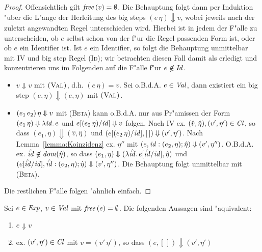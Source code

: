 \documentclass[12pt,fleqn,a4paper]{article}
\newcommand{\RN}[1]{\mbox{\textsc{(#1)}}}
\newcommand{\Cl}{\name{Cl}}
\begin{document}
\begin{proof}
  Offensichtlich gilt ${\text{\it free\/}}\,(v) = \emptyset$. Die Behauptung folgt
  dann per Induktion "uber die L"ange der Herleitung des big steps $(e\,\eta) \Downarrow v$, wobei jeweils nach der
  zuletzt angewandten Regel unterschieden wird. Hierbei ist in jedem der F"alle zu unterscheiden, ob $e$ selbst
  schon von der f"ur die Regel passenden Form ist, oder ob $e$ ein Identifier ist. Ist $e$ ein Identifier, so
  folgt die Behauptung unmittelbar mit IV und big step Regel \RN{Id}; wir betrachten diesen Fall damit als erledigt
  und konzentrieren uns im Folgenden auf die F"alle f"ur $e\not\in{\text{\it Id\/}}$.
  \begin{itemize}
    \item $v \Downarrow v$ mit $\RN{Val}$, d.h. $(e\,\eta) = v$. Sei o.B.d.A. $e \in {\text{\it Val\/}}$, dann existiert ein
          big step $(e,\eta) \Downarrow (e,\eta)$ mit $\RN{Val}$.
          

    \item $(e_1\,e_2)\,\eta \Downarrow v$ mit \RN{Beta} kann o.B.d.A. nur aus Pr"amissen der Form
          $(e_1\,\eta) \Downarrow \lambda {\text{\it id\/}}.\,e$ und $e[(e_2\,\eta)/{\text{\it id\/}}]\Downarrow v$ folgen. Nach IV ex.
          $(\hat{v},\hat{\eta}),(v',\eta')\in\Cl$, so dass $(e_1,\eta) \Downarrow (\hat{v},\hat{\eta})$
          und $(e[(e_2\,\eta)/{\text{\it id\/}}],[\,])\Downarrow (v',\eta')$. Nach Lemma~\ref{lemma:Koinzidenz} ex. $\eta''$
          mit $(e,{\text{\it id\/}}:(e_2,\eta);\hat{\eta}) \Downarrow (v',\eta'')$. O.B.d.A. ex. $\hat{{\text{\it id\/}}}\not\in{\text{\it dom\/}}(\hat{\eta})$,
          so dass $(e_1,\eta) \Downarrow (\lambda \hat{{\text{\it id\/}}}.\,e[\hat{{\text{\it id\/}}}/{\text{\it id\/}}],\hat{\eta})$ und
          $(e[\hat{{\text{\it id\/}}}/{\text{\it id\/}}],\hat{{\text{\it id\/}}}:(e_2,\eta);\hat{\eta}) \Downarrow (v',\eta'')$. Die Behauptung folgt
          unmittelbar mit \RN{Beta}.
  \end{itemize}
  Die restlichen F"alle folgen "ahnlich einfach.
\end{proof}

\begin{theorem}["Aquivalenzsatz]
  Sei $e \in {\text{\it Exp\/}}$, $v \in {\text{\it Val\/}}$ mit ${\text{\it free\/}}\,(e) = \emptyset$. Die folgenden Aussagen sind "aquivalent:
  \begin{enumerate}
    \item $e \Downarrow v$
    \item ex. $(v',\eta')\in\Cl$ mit $v = (v'\,\eta')$, so dass $(e,[\,]) \Downarrow (v',\eta')$
  \end{enumerate}
\end{theorem}
\end{document}
